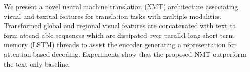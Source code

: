 We present a novel neural machine translation (NMT) architecture associating visual and textual features for translation tasks with multiple modalities. Transformed global and regional visual features are concatenated with text to form attend-able sequences which are dissipated over parallel long short-term memory (LSTM) threads to assist the encoder generating a representation for attention-based decoding. Experiments show that the proposed NMT outperform the text-only baseline.
